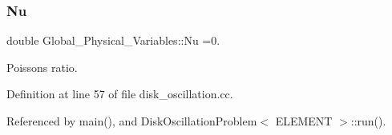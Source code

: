 \subsubsection{\texorpdfstring{Nu}{Nu}}
{\footnotesize\ttfamily double Global\+\_\+\+Physical\+\_\+\+Variables\+::\+Nu =0.}



Poisson\textquotesingle{}s ratio. 



Definition at line 57 of file disk\+\_\+oscillation.\+cc.



Referenced by main(), and Disk\+Oscillation\+Problem$<$ E\+L\+E\+M\+E\+N\+T $>$\+::run().

